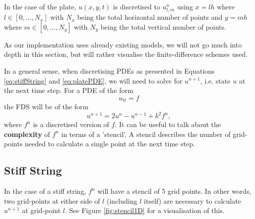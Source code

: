\documentclass{article}
\begin{document}
In the case of the plate, $u(x,y,t)$ is discretised to $u_{l,m}^n$ using $x = lh$ where $l \in [0,\hdots, N_x]$ with $N_x$ being the total horizontal number of points and $y = mh$ where $m \in [0,\hdots,N_y]$ with $N_y$ being the total vertical number of points.

As our implementation uses already existing models, we will not go much into depth in this section, but will rather visualise the finite-difference schemes used. 

In a general sense, when discretising PDEs as presented in Equations \eqref{eq:stiffString} and \eqref{eq:platePDE}, we will need to solve for $u^{n+1}$, i.e. state $u$ at the next time step. For a PDE of the form 
\begin{equation}
u_{tt} = f \label{eq:PDEform}
\end{equation}
the FDS will be of the form
\begin{equation}
    u^{n+1} = 2u^n-u^{n-1} + k^2f^n,
\end{equation}
where $f^n$ is a discretised version of $f$. It can be useful to talk about the \textbf{complexity} %
of $f^n$ in terms of a 'stencil'. A stencil describes the number of grid-points needed to calculate a single point at the next time step. 

\subsection{Stiff String}
In the case of a stiff string, $f^n$ will have a stencil of 5 grid points. In other words, two grid-points at either side of $l$ (including $l$ itself) are necessary to calculate $u^{n+1}$ at grid-point $l$. See Figure \ref{fig:stencil1D} for a visualisation of this.
\end{document}
